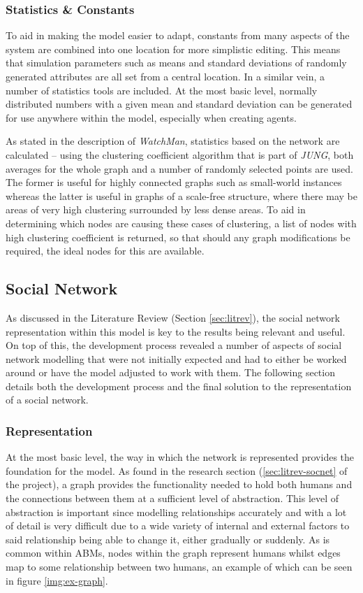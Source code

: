 \documentclass[]{report}
\begin{document}
\subsubsection{Statistics \& Constants}
To aid in making the model easier to adapt, constants from many aspects of the system are combined into one location for more simplistic editing. This means that simulation parameters such as means and standard deviations of randomly generated attributes are all set from a central location. In a similar vein, a number of statistics tools are included. At the most basic level, normally distributed numbers with a given mean and standard deviation can be generated for use anywhere within the model, especially when creating agents.

As stated in the description of \emph{WatchMan}, statistics based on the network are calculated – using the clustering coefficient algorithm that is part of \emph{JUNG}, both averages for the whole graph and a number of randomly selected points are used. The former is useful for highly connected graphs such as small-world instances whereas the latter is useful in graphs of a scale-free structure, where there may be areas of very high clustering surrounded by less dense areas. To aid in determining which nodes are causing these cases of clustering, a list of nodes with high clustering coefficient is returned, so that should any graph modifications be required, the ideal nodes for this are available.

\subsection{Social Network}
\label{sec:socnet}
As discussed in the Literature Review (Section \ref{sec:litrev}), the social network representation within this model is key to the results being relevant and useful. On top of this, the development process revealed a number of aspects of social network modelling that were not initially expected and had to either be worked around or have the model adjusted to work with them. The following section details both the development process and the final solution to the representation of a social network.

\subsubsection{Representation}

At the most basic level, the way in which the network is represented provides the foundation for the model. As found in the research section (\ref{sec:litrev-socnet} of the project), a graph provides the functionality needed to hold both humans and the connections between them at a sufficient level of abstraction. This level of abstraction is important since modelling relationships accurately and with a lot of detail is very difficult due to a wide variety of internal and external factors to said relationship being able to change it, either gradually or suddenly. As is common within ABMs, nodes within the graph represent humans whilst edges map to some relationship between two humans, an example of which can be seen in figure \ref{img:ex-graph}.
\end{document}
